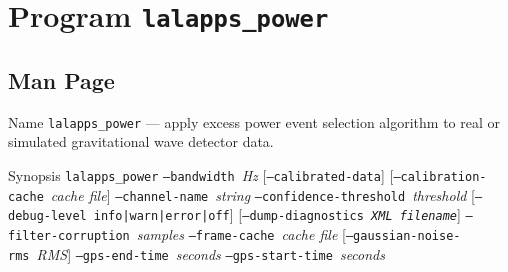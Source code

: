\documentclass[10pt]{article}
\newcommand{\prog}[1]{\texttt{#1}}
\newcommand{\option}[1]{\texttt{#1}}
\newcommand{\parm}[1]{\textit{#1}}
\newenvironment{entry}%
{\begin{list}{}{\renewcommand{\makelabel}[1]%
{\parbox[b]{\labelwidth}{\makebox[0pt][l]{\textbf{##1}}\\}}%
\setlength{\labelwidth}{1em}%
\setlength{\labelsep}{1em}%
\setlength{\leftmargin}{2em}%
\setlength{\topsep}{\medskipamount}%
\setlength{\itemsep}{\medskipamount}%
\setlength{\parsep}{\medskipamount}%
\setlength{\listparindent}{0pt}}}
{\end{list}}
\begin{document}
\section{Program \prog{lalapps\_power}}


\subsection{Man Page}


\begin{entry}

\item[Name]
\prog{lalapps\_power} --- apply excess power event selection algorithm to
real or simulated gravitational wave detector data.

\item[Synopsis]
\prog{lalapps\_power} \newline \hspace*{0.5in}
\option{--bandwidth}~\parm{Hz} \newline \hspace*{0.5in}
[\option{--calibrated-data}] \newline \hspace*{0.5in}
[\option{--calibration-cache}~\parm{cache file}] \newline \hspace*{0.5in}
\option{--channel-name}~\parm{string} \newline \hspace*{0.5in}
\option{--confidence-threshold}~\parm{threshold} \newline \hspace*{0.5in}
[\option{--debug-level}~\option{info|warn|error|off}] \newline \hspace*{0.5in}
[\option{--dump-diagnostics~\parm{XML filename}}] \newline \hspace*{0.5in}
\option{--filter-corruption}~\parm{samples} \newline \hspace*{0.5in}
\option{--frame-cache}~\parm{cache file} \newline \hspace*{0.5in}
[\option{--gaussian-noise-rms}~\parm{RMS}] \newline \hspace*{0.5in}
\option{--gps-end-time}~\parm{seconds} \newline \hspace*{0.5in}
\option{--gps-start-time}~\parm{seconds} \newline \hspace*{0.5in}

\end{entry}
\end{document}
